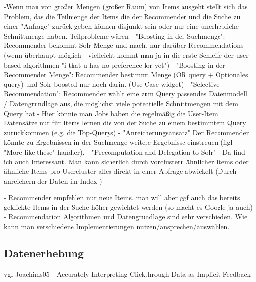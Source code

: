 -Wenn man von großen Mengen (großer Raum) von Items ausgeht stellt sich das Problem, das die Teilmenge der Items die der Recommender und die Suche zu einer "Anfrage" zurück geben können disjunkt sein oder nur eine unerhebliche Schnittmenge haben. Teilprobleme wären
   - "Boosting in der Suchmenge": Recommender bekommt Solr-Menge und macht nur darüber Recommendations (wenn überhaupt möglich - vielleicht kommt man ja in die erste Schleife der user-based algorithmen "i that u has no preference for yet")
   - "Boosting in der Recommender Menge": Recommender bestimmt Menge (OR query + Optionales query) und Solr boosted nur noch darin. (Use-Case widget)
   -  "Selective Recommendation": Recommender wählt eine zum Query passendes Datenmodell / Datengrundlage aus, die möglichst viele potentielle Schnittmengen mit dem Query hat
       - Hier könnte man Jobs haben die regelmäßig die User-Item Datensätze nur für Items lernen die von der Suche zu einem bestimmtem Query zurückkommen (e.g. die Top-Querys)
   - "Anreicherungsansatz" Der Recommender könnte zu Ergebnissen in der Suchmenge weitere Ergebnisse einstreuen (flgl "More like these" handler).
   - "Precomputation and Delegation to Solr"
- Da find ich auch Interessant. Man kann sicherlich durch vorclustern ähnlicher Items oder ähnliche Items pro Usercluster alles direkt in einer Abfrage abwickelt  (Durch anreichern der Daten im Index )

- Recommender empfehlen nur neue Items, man will aber ggf auch das bereits geklickte Items in der Suche höher gewichtet werden (so macht es Google ja auch)
- Recommendation Algorithmen und Datengrundlage sind sehr verschieden. Wie kann man verschiedene Implementierungen nutzen/ansprechen/auswählen.


\subsection{Datenerhebung}

vgl Joachims05 - Accurately Interpreting Clickthrough Data as Implicit Feedback
\newpage

